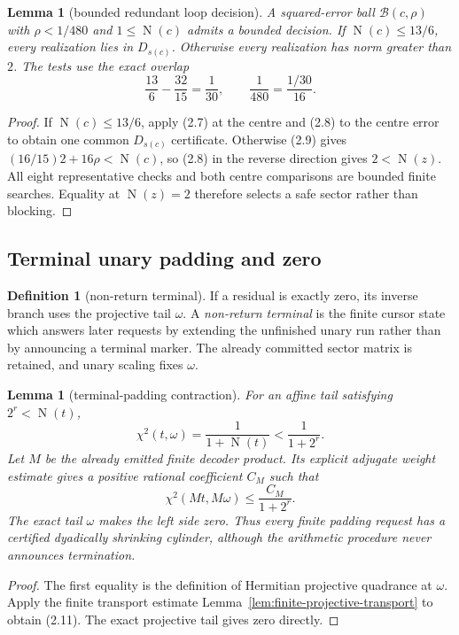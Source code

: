 \documentclass[10pt]{article}
\newtheorem{lemma}[theorem]{Lemma}
\theoremstyle{definition}
\newtheorem{definition}[theorem]{Definition}
\theoremstyle{remark}
\newcommand{\Norm}{\operatorname{N}}
\begin{document}
\begin{lemma}[bounded redundant loop decision]
\label{lem:bounded-loop-decision}
A squared-error ball $\mathcal B(c,\rho)$ with $\rho<1/480$ and
$1\le\Norm(c)$ admits a bounded decision.  If $\Norm(c)\le13/6$, every
realization lies in $D_{s(c)}$.  Otherwise every realization has norm greater
than $2$.  The tests use the exact overlap
\[
 \frac{13}{6}-\frac{32}{15}=\frac1{30},
 \qquad \frac1{480}=\frac{1/30}{16}.
\tag{2.9}
\]
\end{lemma}

\begin{proof}
If $\Norm(c)\le13/6$, apply (2.7) at the centre and (2.8)
to the centre error to obtain one common $D_{s(c)}$ certificate.  Otherwise
(2.9) gives $(16/15)2+16\rho<\Norm(c)$, so (2.8) in the
reverse direction gives $2<\Norm(z)$.
All eight representative checks and both centre comparisons are bounded
finite searches.  Equality at $\Norm(z)=2$ therefore selects a safe sector
rather than blocking.
\end{proof}

\subsection{Terminal unary padding and zero}

\begin{definition}[non-return terminal]
If a residual is exactly zero, its inverse branch uses the projective tail
$\omega$.  A \emph{non-return terminal} is the finite cursor state which
answers later requests by extending the unfinished unary run rather than by
announcing a terminal marker.  The already committed sector matrix is
retained, and unary scaling fixes $\omega$.
\end{definition}

\begin{lemma}[terminal-padding contraction]
\label{lem:terminal-padding}
For an affine tail satisfying $2^r<\Norm(t)$,
\[
 \chi^2(t,\omega)=\frac1{1+\Norm(t)}
 <\frac1{1+2^r}.
\tag{2.10}
\]
Let $M$ be the already emitted finite decoder product.  Its explicit adjugate weight estimate gives a positive rational coefficient $C_M$ such that
\[
 \chi^2(Mt,M\omega)\le\frac{C_M}{1+2^r}.
\tag{2.11}
\]
The exact tail $\omega$ makes the left side zero.  Thus every finite padding request has a certified dyadically shrinking cylinder, although the arithmetic procedure never announces termination.
\end{lemma}

\begin{proof}
The first equality is the definition of Hermitian projective quadrance at
$\omega$.  Apply the finite transport estimate
Lemma~\ref{lem:finite-projective-transport} to obtain (2.11).  The exact
projective tail gives zero directly.
\end{proof}
\end{document}
